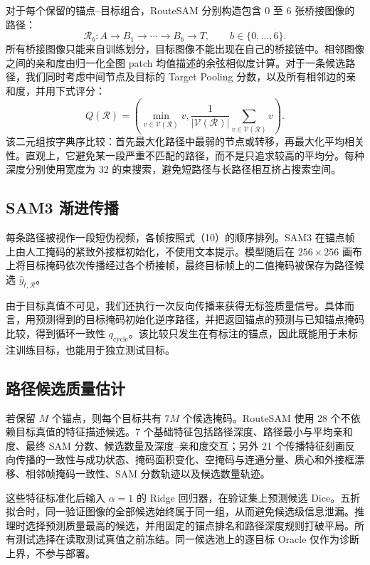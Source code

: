 \documentclass[UTF8,a4paper,10pt]{ctexart}
\begin{document}
对于每个保留的锚点--目标组合，RouteSAM 分别构造包含 0 至 6 张桥接图像的路径：
\begin{equation}
\mathcal{R}_{b}: A\rightarrow B_1\rightarrow\cdots\rightarrow B_b\rightarrow T,
\qquad b\in\{0,\ldots,6\}.
\end{equation}
所有桥接图像只能来自训练划分，目标图像不能出现在自己的桥接链中。相邻图像之间的亲和度由归一化全图 patch 均值描述的余弦相似度计算。对于一条候选路径，我们同时考虑中间节点及目标的 Target Pooling 分数，以及所有相邻边的亲和度，并用下式评分：
\begin{equation}
Q(\mathcal{R})=\left(\min_{v\in\mathcal{V}(\mathcal{R})}v,
\frac{1}{|\mathcal{V}(\mathcal{R})|}\sum_{v\in\mathcal{V}(\mathcal{R})}v\right).
\end{equation}
该二元组按字典序比较：首先最大化路径中最弱的节点或转移，再最大化平均相关性。直观上，它避免某一段严重不匹配的路径，而不是只追求较高的平均分。每种深度分别使用宽度为 32 的束搜索，避免短路径与长路径相互挤占搜索空间。

\subsection{SAM3 渐进传播}
\label{sec:sam3-propagation-zh}

每条路径被视作一段短伪视频，各帧按照式（10）的顺序排列。SAM3 在锚点帧上由人工掩码的紧致外接框初始化，不使用文本提示。模型随后在 $256\times256$ 画布上将目标掩码依次传播经过各个桥接帧，最终目标帧上的二值掩码被保存为路径候选 $\hat{y}_{t,\mathcal{R}}$。

由于目标真值不可见，我们还执行一次反向传播来获得无标签质量信号。具体而言，用预测得到的目标掩码初始化逆序路径，并把返回锚点的预测与已知锚点掩码比较，得到循环一致性 $q_{\mathrm{cycle}}$。该比较只发生在有标注的锚点，因此既能用于未标注训练目标，也能用于独立测试目标。

\subsection{路径候选质量估计}
\label{sec:router-zh}

若保留 $M$ 个锚点，则每个目标共有 $7M$ 个候选掩码。RouteSAM 使用 28 个不依赖目标真值的特征描述候选。7 个基础特征包括路径深度、路径最小与平均亲和度、最终 SAM 分数、候选数量及深度--亲和度交互；另外 21 个传播特征刻画反向传播的一致性与成功状态、掩码面积变化、空掩码与连通分量、质心和外接框漂移、相邻帧掩码一致性、SAM 分数轨迹以及候选数量轨迹。

这些特征标准化后输入 $\alpha=1$ 的 Ridge 回归器，在验证集上预测候选 Dice。五折拟合时，同一验证图像的全部候选始终属于同一组，从而避免候选级信息泄漏。推理时选择预测质量最高的候选，并用固定的锚点排名和路径深度规则打破平局。所有测试选择在读取测试真值之前冻结。同一候选池上的逐目标 Oracle 仅作为诊断上界，不参与部署。
\end{document}
